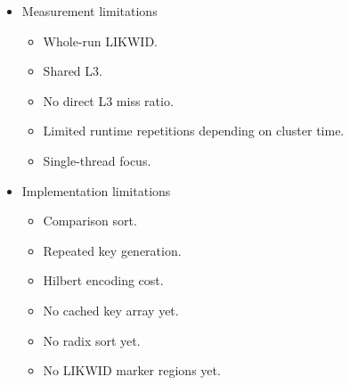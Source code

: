 \begin{itemize}
    \item Measurement limitations
    \begin{itemize}
        \item Whole-run LIKWID.
        \item Shared L3.
        \item No direct L3 miss ratio.
        \item Limited runtime repetitions depending on cluster time.
        \item Single-thread focus.
    \end{itemize}

    \item Implementation limitations
    \begin{itemize}
        \item Comparison sort.
        \item Repeated key generation.
        \item Hilbert encoding cost.
        \item No cached key array yet.
        \item No radix sort yet.
        \item No LIKWID marker regions yet.
    \end{itemize}
\end{itemize}

